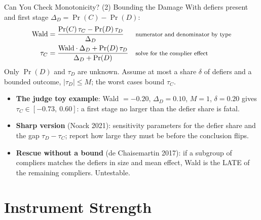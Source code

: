\documentclass[aspectratio=169,11pt,xcolor=dvipsnames]{beamer}
\newcommand{\srcp}[1]{{\scriptsize\color{gray}(#1)}}
\begin{document}
\begin{frame}{Can You Check Monotonicity? (2) Bounding the Damage}
With defiers present and first stage $\Delta_D = \Pr(C) - \Pr(D)$:
\begin{align*}
  \text{Wald} &= \frac{\Pr(C)\,\tau_C - \Pr(D)\,\tau_D}{\Delta_D}
     && \text{\footnotesize numerator and denominator by type} \\
  \tau_C &= \frac{\text{Wald}\cdot\Delta_D + \Pr(D)\,\tau_D}{\Delta_D + \Pr(D)}
     && \text{\footnotesize solve for the complier effect}
\end{align*}
\vskip-2pt
Only $\Pr(D)$ and $\tau_D$ are unknown. Assume \alert{at most a share $\delta$
of defiers} and a bounded outcome, $|\tau_D| \le M$; the worst cases bound $\tau_C$.
\begin{itemize}\itemsep2pt
  \item \textbf{The judge toy example}: Wald $= -0.20$, $\Delta_D = 0.10$, $M = 1$,
        $\delta = 0.20$ gives $\tau_C \in [-0.73,\ 0.60]$: a first stage no larger
        than the defier share is fatal.
  \item \textbf{Sharp version} \srcp{Noack 2021}: sensitivity parameters for the
        defier share and the gap $\tau_D - \tau_C$; report how large they must be
        before the conclusion flips.
  \item \textbf{Rescue without a bound} \srcp{de Chaisemartin 2017}: if a subgroup
        of compliers matches the defiers in size and mean effect, Wald is the
        LATE of the remaining compliers. Untestable.
\end{itemize}
\end{frame}

\section[Strength]{Instrument Strength}
\begin{frame}\sectionpage\end{frame}
\end{document}
